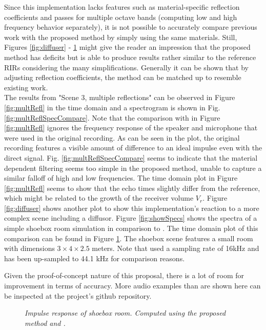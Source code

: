 \documentclass[twoside,a4paper]{article}
\begin{document}
Since this implementation lacks features such as material-specific reflection coefficients and passes for multiple octave bands (computing low and high frequency behavior separately), it is not possible to accurately compare previous work with the proposed method by simply using the same materials. Still, Figures \ref{fig:diffuser} - \ref{fig:shoe} might give the reader an impression that the proposed method has deficits but is able to produce results rather similar to the reference RIRs considering the many simplifications. Generally it can be shown that by adjusting reflection coefficients, the method can be matched up to resemble existing work. \\
The results from "Scene 3, multiple reflections" can be observed in Figure \ref{fig:multRefl} in the time domain and a spectrogram is shown in Fig. \ref{fig:multReflSpecCompare}. Note that the comparison with \cite{brinkmann_round_2019} in Figure \ref{fig:multRefl} ignores the frequency response of the speaker and microphone that were used in the original recording. As can be seen in the plot, the original recording features a visible amount of difference to an ideal impulse even with the direct signal. Fig. \ref{fig:multReflSpecCompare} seems to indicate that the material dependent filtering seems too simple in the proposed method, unable to capture a similar falloff of high and low frequencies. The time domain plot in Figure \ref{fig:multRefl} seems to show that the echo times slightly differ from the reference, which might be related to the growth of the receiver volume $V_r$.
Figure \ref{fig:diffuser} shows another plot to show this implementation's reaction to a more complex scene including a diffusor.  
Figure \ref{fig:showSpecs} shows the spectra of a simple shoebox room simulation in comparison to \cite{lehmann_fast_2020}. The time domain plot of this comparison can be found in Figure \ref{fig:shoe}. The shoebox scene features a small room with dimensions $3 \times 4 \times 2.5$ meters. Note that \cite{lehmann_fast_2020} used a sampling rate of 16kHz and has been up-sampled to 44.1 kHz for comparison reasons.

Given the proof-of-concept nature of this proposal, there is a lot of room for improvement in terms of accuracy. More audio examples than are shown here can be inspected at the project's github repository.



\begin{figure}
    \begin{center}
      
    \end{center}
    \caption{\label{fig:shoe} \it Impulse response of shoebox room. Computed using the proposed method and \cite{lehmann_fast_2020}. }
    
\end{figure}
\end{document}

